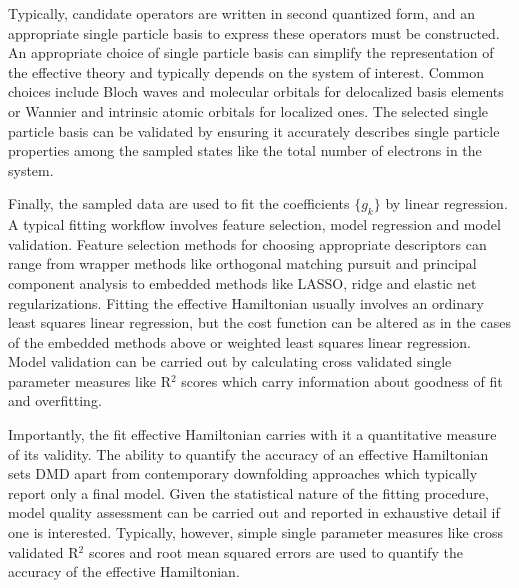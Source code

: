 \documentclass[12pt]{article}
\begin{document}
Typically, candidate operators are written in second quantized form, and an appropriate single particle basis to express these operators must be constructed.
An appropriate choice of single particle basis can simplify the representation of the effective theory and typically depends on the system of interest.
Common choices include Bloch waves and molecular orbitals for delocalized basis elements or Wannier and intrinsic atomic orbitals for localized ones.
The selected single particle basis can be validated by ensuring it accurately describes single particle properties among the sampled states like the total number of electrons in the system.

Finally, the sampled data are used to fit the coefficients $\{g_k\}$ by linear regression.
A typical fitting workflow involves feature selection, model regression and model validation.
Feature selection methods for choosing appropriate descriptors can range from wrapper methods like orthogonal matching pursuit and principal component analysis to embedded methods like LASSO, ridge and elastic net regularizations. 
Fitting the effective Hamiltonian usually involves an ordinary least squares linear regression, but the cost function can be altered as in the cases of the embedded methods above or weighted least squares linear regression.
Model validation can be carried out by calculating cross validated single parameter measures like R$^2$ scores which carry information about goodness of fit and overfitting.

Importantly, the fit effective Hamiltonian carries with it a quantitative measure of its validity.
The ability to quantify the accuracy of an effective Hamiltonian sets DMD apart from contemporary downfolding approaches which typically report only a final model.
Given the statistical nature of the fitting procedure, model quality assessment can be carried out and reported in exhaustive detail if one is interested.
Typically, however, simple single parameter measures like cross validated R$^2$ scores and root mean squared errors are used to quantify the accuracy of the effective Hamiltonian.
\end{document}

